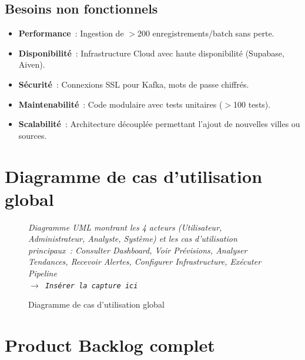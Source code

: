 \documentclass[a4paper,12pt,oneside]{report}
\newcommand{\imgplaceholder}[2]{%
  \begin{tcolorbox}[colback=blue!5,colframe=blue!40,title=#1]
    \centering\itshape #2\\[6pt]
    \texttt{$\rightarrow$ Insérer la capture ici}
  \end{tcolorbox}
}
\begin{document}
\subsection{Besoins non fonctionnels}
\begin{itemize}
  \item \textbf{Performance}~: Ingestion de $>$200 enregistrements/batch sans perte.
  \item \textbf{Disponibilité}~: Infrastructure Cloud avec haute disponibilité (Supabase, Aiven).
  \item \textbf{Sécurité}~: Connexions SSL pour Kafka, mots de passe chiffrés.
  \item \textbf{Maintenabilité}~: Code modulaire avec tests unitaires ($>$100 tests).
  \item \textbf{Scalabilité}~: Architecture découplée permettant l'ajout de nouvelles villes ou sources.
\end{itemize}

\section{Diagramme de cas d'utilisation global}

\begin{figure}[H]
\centering
\imgplaceholder{Figure~\ref{fig:uc_global} — Diagramme de cas d'utilisation global}{Diagramme UML montrant les 4 acteurs (Utilisateur, Administrateur, Analyste, Système) et les cas d'utilisation principaux~: Consulter Dashboard, Voir Prévisions, Analyser Tendances, Recevoir Alertes, Configurer Infrastructure, Exécuter Pipeline}
\caption{Diagramme de cas d'utilisation global}
\label{fig:uc_global}
\end{figure}

\section{Product Backlog complet}
\end{document}
